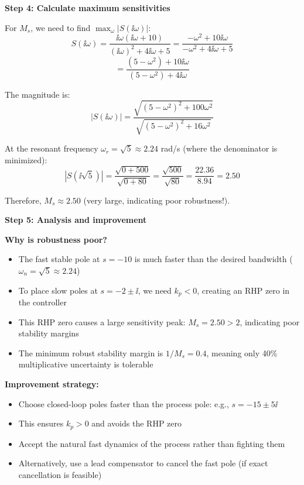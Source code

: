 \documentclass[11pt,a4paper]{article}
\begin{document}
\textbf{Step 4: Calculate maximum sensitivities}

For $M_s$, we need to find $\max_\omega |S(\ii\omega)|$:
\begin{equation}
  S(\ii\omega) = \frac{\ii\omega(\ii\omega + 10)}{(\ii\omega)^2 + 4\ii\omega + 5} = \frac{-\omega^2 + 10\ii\omega}{-\omega^2 + 4\ii\omega + 5}
\end{equation}
\begin{equation}
  = \frac{(5-\omega^2) + 10\ii\omega}{(5-\omega^2) + 4\ii\omega}
\end{equation}

The magnitude is:
\begin{equation}
  |S(\ii\omega)| = \frac{\sqrt{(5-\omega^2)^2 + 100\omega^2}}{\sqrt{(5-\omega^2)^2 + 16\omega^2}}
\end{equation}

At the resonant frequency $\omega_r = \sqrt{5} \approx 2.24$ rad/s (where the denominator is minimized):
\begin{equation}
  |S(\ii\sqrt{5})| = \frac{\sqrt{0 + 500}}{\sqrt{0 + 80}} = \frac{\sqrt{500}}{\sqrt{80}} = \frac{22.36}{8.94} = 2.50
\end{equation}

Therefore, $M_s \approx 2.50$ (very large, indicating poor robustness!).

\textbf{Step 5: Analysis and improvement}

\textbf{Why is robustness poor?}
\begin{itemize}
  \item The fast stable pole at $s = -10$ is much faster than the desired bandwidth ($\omega_n = \sqrt{5} \approx 2.24$)
  \item To place slow poles at $s = -2 \pm \ii$, we need $k_p < 0$, creating an RHP zero in the controller
  \item This RHP zero causes a large sensitivity peak: $M_s = 2.50 > 2$, indicating poor stability margins
  \item The minimum robust stability margin is $1/M_s = 0.4$, meaning only 40\% multiplicative uncertainty is tolerable
\end{itemize}

\textbf{Improvement strategy:}
\begin{itemize}
  \item Choose closed-loop poles faster than the process pole: e.g., $s = -15 \pm 5\ii$
  \item This ensures $k_p > 0$ and avoids the RHP zero
  \item Accept the natural fast dynamics of the process rather than fighting them
  \item Alternatively, use a lead compensator to cancel the fast pole (if exact cancellation is feasible)
\end{itemize}
\end{document}
